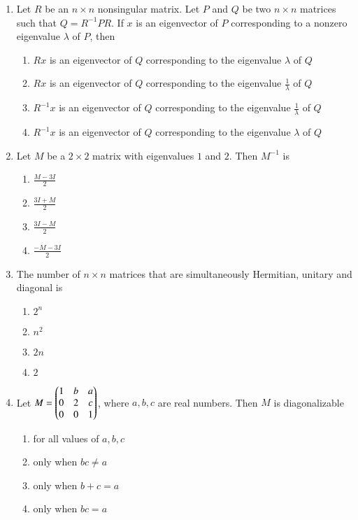 \documentclass[journal]{IEEEtran}
\begin{document}
\begin{enumerate}
    \item Let $R$ be an $n \times n$ nonsingular matrix. Let $P$ and $Q$ be two $n \times n$ matrices such
    that $Q= R^{-1}PR$. If $x$ is an eigenvector of $P$ corresponding to a nonzero eigenvalue $\lambda$ of $P$, then
        \begin{enumerate}
            \item $Rx$ is an eigenvector of $Q$ corresponding to the eigenvalue $\lambda$ of $Q$
            \item $Rx$ is an eigenvector of $Q$ corresponding to the eigenvalue $\frac{1}{\lambda}$ of $Q$
            \item $R^{-1}x$ is an eigenvector of $Q$ corresponding to the eigenvalue $\frac{1}{\lambda}$ of $Q$
            \item $R^{-1}x$ is an eigenvector of $Q$ corresponding to the eigenvalue $\lambda$ of $Q$
        \end{enumerate}

    \item Let $M$ be a $2 \times 2$ matrix with eigenvalues $1$ and $2$. Then $M^{-1}$ is
        \begin{enumerate}
            \item $\frac{M-3I}{2}$
            \item $\frac{3I+M}{2}$
            \item $\frac{3I-M}{2}$
            \item $\frac{-M-3I}{2}$
        \end{enumerate}

    \item The number of $n \times n$ matrices that are simultaneously Hermitian, unitary and diagonal is
        \begin{enumerate}
            \item $2^n$
            \item $n^2$
            \item $2n$
            \item $2$
        \end{enumerate}

    \item Let $M = \begin{pmatrix}1&b&a\\0&2&c\\0&0&1\end{pmatrix}$, where $a,b,c$ are real numbers. Then $M$ is diagonalizable 
        \begin{enumerate}
            \item for all values of $a,b,c$
            \item only when $bc \neq a$
            \item only when $b+c=a$
            \item only when $bc=a$
        \end{enumerate}


\end{enumerate}
\end{document}
